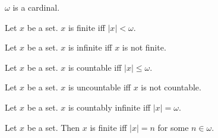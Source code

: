 \documentclass[../set-theory.tex]{subfiles}
\begin{document}
  \begin{forthel}
    \begin{corollary}
      $\omega$ is a cardinal.
    \end{corollary}
  \end{forthel}

  \begin{forthel}
    \begin{definition}
      Let $x$ be a set.
      $x$ is finite iff $|x| < \omega$.
    \end{definition}
  \end{forthel}

  \begin{forthel}
    \begin{definition}
      Let $x$ be a set.
      $x$ is infinite iff $x$ is not finite.
    \end{definition}
  \end{forthel}

  \begin{forthel}
    \begin{definition}
      Let $x$ be a set.
      $x$ is countable iff $|x| \leq \omega$.
    \end{definition}
  \end{forthel}

  \begin{forthel}
    \begin{definition}
      Let $x$ be a set.
      $x$ is uncountable iff $x$ is not countable.
    \end{definition}
  \end{forthel}

  \begin{forthel}
    \begin{definition}
      Let $x$ be a set.
      $x$ is countably infinite iff $|x| = \omega$.
    \end{definition}
  \end{forthel}

  \begin{forthel}
    \begin{proposition}
      Let $x$ be a set.
      Then $x$ is finite iff $|x| = n$ for some $n \in \omega$.
    \end{proposition}
  \end{forthel}
\end{document}
